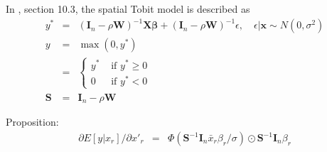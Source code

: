 \documentclass[a4paper]{article}
\def\bfx{\mbox{$\boldsymbol{\mathbf{x}}$}}
\def\bfbeta{\mbox{$\boldsymbol{\beta}$}}
\def\bfI{\mbox{$\boldsymbol{\mathbf{I}}$}}
\def\bfS{\mbox{$\boldsymbol{\mathbf{S}}$}}
\def\bfW{\mbox{$\boldsymbol{\mathbf{W}}$}}
\def\bfX{\mbox{$\boldsymbol{\mathbf{X}}$}}
\begin{document}
In \cite{LeSage2009}, section 10.3, the spatial Tobit model is described as
\begin{eqnarray}
  y^{*} & = & (\bfI_n - \rho \bfW)^{-1} \bfX \bfbeta + (\bfI_n - \rho \bfW)^{-1} \epsilon, \quad \epsilon | \bfx \sim N(0, \sigma^2) \\
	y     & = & \max(0, y^{*})\\
	      & = & \left\{ 
	              \begin{array}{cc}
								  y^{*} & \text{ if } y^{*} \ge 0  \\
									0 & \text{ if } y^{*} < 0
								\end{array}
	            \right. \\
	\bfS     & = & \bfI_n - \rho \bfW 
\end{eqnarray}

Proposition:
\begin{eqnarray}
\partial E[y | x_r] / \partial x'_r & = & \Phi(\bfS^{-1} \bfI_n \bar{x}_r \beta_r / \sigma) \odot \bfS^{-1} \bfI_n \beta_r
\end{eqnarray}



\end{document}

